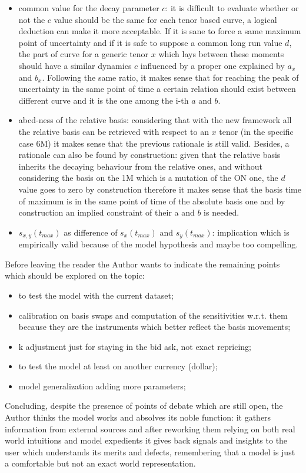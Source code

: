 \begin{itemize}
    \item common value for the decay parameter $c$: it is difficult to evaluate whether or not the $c$ value should be the same for each tenor based curve, a logical deduction can make it more acceptable. If it is sane to force a same maximum point of uncertainty and if it is safe to suppose a common long run value $d$, the part of curve for a generic tenor $x$ which lays between these moments should have a similar dynamics $c$ influenced by a proper one explained by $a_{x}$ and $b_{x}$. Following the same ratio, it makes sense that for reaching the peak of uncertainty in the same point of time a certain relation should exist between different curve and it is the one among the i-th $a$ and $b$.
    \item abcd-ness of the relative basis: considering that with the new framework all the relative basis can be retrieved with respect to an $x$ tenor (in the specific case 6M) it makes sense that the previous rationale is still valid. Besides, a rationale can also be found by construction: given that the relative basis inherits the decaying behaviour from the relative ones, and without considering the basis on the 1M which is a mutation of the ON one, the $d$ value goes to zero by construction therefore it makes sense that the basis time of maximum is in the same point of time of the absolute basis one and by construction an implied constraint of their a and $b$ is needed.
    \item$s_{x,y}(t_{max})$ as difference of $s_{x}(t_{max})$ and $s_{y}(t_{max})$: implication which is empirically valid because of the model hypothesis and maybe too  compelling.
\end{itemize} 

Before leaving the reader the Author wants to indicate the remaining points which should be explored on the topic:

\begin{itemize}
    \item to test the model with the current dataset;
    \item calibration on basis swaps and computation of the sensitivities w.r.t. them because they are the instruments which better reflect the basis movements;
    \item k adjustment just for staying in the bid ask, not exact repricing;
    \item to test the model at least on another currency (dollar);
    \item model generalization adding more parameters;
\end{itemize}

Concluding, despite the presence of points of debate which are still open, the Author thinks the model works and absolves its noble function: it gathers information from external sources and after reworking them relying on both real world intuitions and model expedients it gives back signals and insights to the user which understands its merits and defects, remembering that a model is just a comfortable but not an exact world representation.

